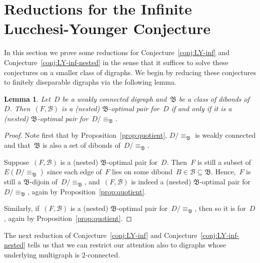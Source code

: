 \documentclass[reqno, 12pt]{amsart}
\numberwithin{equation}{section}
\numberwithin{figure}{section}
\theoremstyle{plain}
\newtheorem{lemma}[thm]{Lemma}
\theoremstyle{definition}
\begin{document}
\section{Reductions for the Infinite Lucchesi-Younger Conjecture}
\label{sec:reduce}

In this section we prove some reductions for Conjecture~\ref{conj:LY-inf} and Conjecture~\ref{conj:LY-inf-nested} in the sense that it suffices to solve these conjectures on a smaller class of digraphs. 
We begin by reducing these conjectures to finitely diseparable digraphs via the following lemma. 


\begin{lemma}
    \label{lem:fin-disep}
    Let~$D$ be a weakly connected digraph 
    and~$\mathfrak{B}$ be a 
    class of dibonds of~$D$.
    Then~${(F, \mathcal{B})}$ is a (nested) $\mathfrak{B}$-optimal pair for~$D$ if and only if it is a (nested) $\mathfrak{B}$-optimal pair for~${D{/}\equiv_\mathfrak{B}}$.
\end{lemma}

\begin{proof}
    Note first that by Proposition~\ref{prop:quotient}, $D{/}{\equiv_\mathfrak{B}}$ is weakly connected and that~$\mathfrak{B}$ is also a set of dibonds of~${D{/}{\equiv_\mathfrak{B}}}$. 
    
    Suppose~${(F, \mathcal{B})}$ is a (nested) $\mathfrak{B}$-optimal pair for~$D$. 
    Then~$F$ is still a subset of~${E(D{/}{\equiv_\mathfrak{B}})}$ since each edge of~$F$ lies on some dibond~${B \in \mathcal{B} \subseteq \mathfrak{B}}$. 
    Hence,~$F$ is still a $\mathfrak{B}$-dijoin of~${D{/}{\equiv_\mathfrak{B}}}$, and~${(F, \mathcal{B})}$ is indeed a (nested) $\mathfrak{B}$-optimal pair for~${D{/}{\equiv_\mathfrak{B}}}$, again by Proposition~\ref{prop:quotient}. 
    
    Similarly, if~${(F, \mathcal{B})}$ is a (nested) $\mathfrak{B}$-optimal pair for~${D{/}\equiv_\mathfrak{B}}$, then so it is for~$D$, again by Proposition~\ref{prop:quotient}.
\end{proof}


The next reduction of Conjecture~\ref{conj:LY-inf} and Conjecture~\ref{conj:LY-inf-nested} tells us that we can restrict our attention also to digraphs whose underlying multigraph is $2$-connected.
\end{document}
